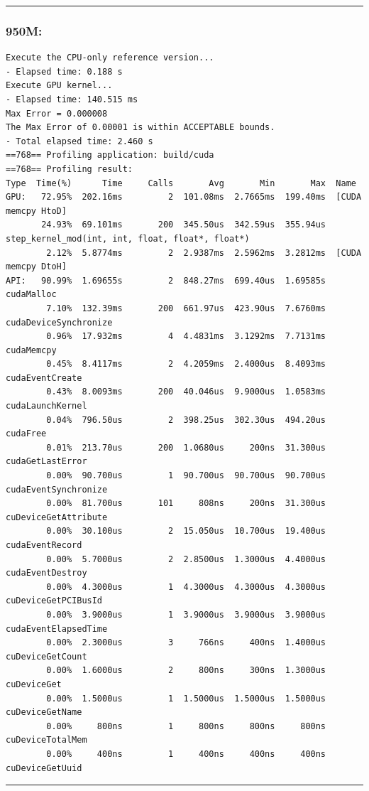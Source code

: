 \hrule

\subsubsection*{950M:}
{\scriptsize
\begin{verbatim}
Execute the CPU-only reference version...
- Elapsed time: 0.188 s
Execute GPU kernel...
- Elapsed time: 140.515 ms
Max Error = 0.000008
The Max Error of 0.00001 is within ACCEPTABLE bounds.
- Total elapsed time: 2.460 s
==768== Profiling application: build/cuda
==768== Profiling result:
Type  Time(%)      Time     Calls       Avg       Min       Max  Name
GPU:   72.95%  202.16ms         2  101.08ms  2.7665ms  199.40ms  [CUDA memcpy HtoD]
       24.93%  69.101ms       200  345.50us  342.59us  355.94us  step_kernel_mod(int, int, float, float*, float*)
        2.12%  5.8774ms         2  2.9387ms  2.5962ms  3.2812ms  [CUDA memcpy DtoH]
API:   90.99%  1.69655s         2  848.27ms  699.40us  1.69585s  cudaMalloc
        7.10%  132.39ms       200  661.97us  423.90us  7.6760ms  cudaDeviceSynchronize
        0.96%  17.932ms         4  4.4831ms  3.1292ms  7.7131ms  cudaMemcpy
        0.45%  8.4117ms         2  4.2059ms  2.4000us  8.4093ms  cudaEventCreate
        0.43%  8.0093ms       200  40.046us  9.9000us  1.0583ms  cudaLaunchKernel
        0.04%  796.50us         2  398.25us  302.30us  494.20us  cudaFree
        0.01%  213.70us       200  1.0680us     200ns  31.300us  cudaGetLastError
        0.00%  90.700us         1  90.700us  90.700us  90.700us  cudaEventSynchronize
        0.00%  81.700us       101     808ns     200ns  31.300us  cuDeviceGetAttribute
        0.00%  30.100us         2  15.050us  10.700us  19.400us  cudaEventRecord
        0.00%  5.7000us         2  2.8500us  1.3000us  4.4000us  cudaEventDestroy
        0.00%  4.3000us         1  4.3000us  4.3000us  4.3000us  cuDeviceGetPCIBusId
        0.00%  3.9000us         1  3.9000us  3.9000us  3.9000us  cudaEventElapsedTime
        0.00%  2.3000us         3     766ns     400ns  1.4000us  cuDeviceGetCount
        0.00%  1.6000us         2     800ns     300ns  1.3000us  cuDeviceGet
        0.00%  1.5000us         1  1.5000us  1.5000us  1.5000us  cuDeviceGetName
        0.00%     800ns         1     800ns     800ns     800ns  cuDeviceTotalMem
        0.00%     400ns         1     400ns     400ns     400ns  cuDeviceGetUuid
\end{verbatim}
}

\hrule


